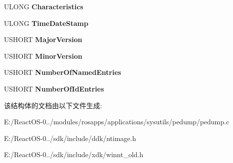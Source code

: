 \begin{DoxyCompactItemize}
\item 
\mbox{\label{struct___i_m_a_g_e___r_e_s_o_u_r_c_e___d_i_r_e_c_t_o_r_y_a3653047f46ce7503a947d3439b340032}} 
U\+L\+O\+NG {\bfseries Characteristics}
\item 
\mbox{\label{struct___i_m_a_g_e___r_e_s_o_u_r_c_e___d_i_r_e_c_t_o_r_y_ad62e4a53c6ea4bdb500163c1f0fbba5b}} 
U\+L\+O\+NG {\bfseries Time\+Date\+Stamp}
\item 
\mbox{\label{struct___i_m_a_g_e___r_e_s_o_u_r_c_e___d_i_r_e_c_t_o_r_y_a54c9a006506113b4a8f20133c004384b}} 
U\+S\+H\+O\+RT {\bfseries Major\+Version}
\item 
\mbox{\label{struct___i_m_a_g_e___r_e_s_o_u_r_c_e___d_i_r_e_c_t_o_r_y_ae4b8441a477a914d653d798e92319919}} 
U\+S\+H\+O\+RT {\bfseries Minor\+Version}
\item 
\mbox{\label{struct___i_m_a_g_e___r_e_s_o_u_r_c_e___d_i_r_e_c_t_o_r_y_ae5c2a78f18a67b5f09cf4795a2602177}} 
U\+S\+H\+O\+RT {\bfseries Number\+Of\+Named\+Entries}
\item 
\mbox{\label{struct___i_m_a_g_e___r_e_s_o_u_r_c_e___d_i_r_e_c_t_o_r_y_ae2b8bfd0ca39d528e5168e4ee415e7cb}} 
U\+S\+H\+O\+RT {\bfseries Number\+Of\+Id\+Entries}
\end{DoxyCompactItemize}


该结构体的文档由以下文件生成\+:\begin{DoxyCompactItemize}
\item 
E\+:/\+React\+O\+S-\/0../modules/rosapps/applications/sysutils/pedump/pedump.\+c\item 
E\+:/\+React\+O\+S-\/0../sdk/include/ddk/ntimage.\+h\item 
E\+:/\+React\+O\+S-\/0../sdk/include/xdk/winnt\+\_\+old.\+h\end{DoxyCompactItemize}
